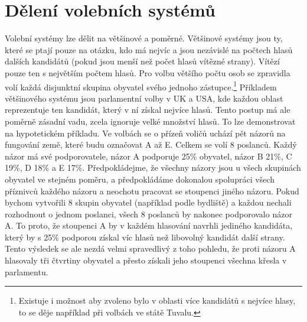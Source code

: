 \documentclass[12pt]{report}
\begin{document}
\section{Dělení volebních systémů}
Volební systémy lze dělit na většinové a poměrné.
Většinové systémy jsou ty, které se ptají pouze na otázku, kdo má nejvíc a jsou nezávislé na počtech hlasů dalších kandidátů (pokud jsou menší než počet hlasů vítězné strany).
Vítězí pouze ten s největším počtem hlasů.
Pro volbu většího počtu osob se zpravidla volí každá disjunktní skupina obyvatel svého jednoho zástupce.\footnote{Existuje i možnost aby zvoleno bylo v oblasti více kandidátů s nejvíce hlasy, to se děje například při volbách ve státě Tuvalu.\autocite{TUV}}
Příkladem většinového systému jsou parlamentní volby v UK a USA, kde každou oblast reprezentuje ten kandidát, který v ní získal nejvíce hlasů.
Tento postup má ale poměrně zásadní vadu, zcela ignoruje velké množství hlasů.
To lze demonstrovat na hypotetickém příkladu.
Ve volbách se o přízeň voličů uchází pět názorů na fungování země, které budu označovat A až E.
Celkem se volí 8 poslanců.
Každý názor má své podporovatele, názor A podporuje 25\% obyvatel, názor B 21\%, C 19\%, D 18\% a E 17\%.
Předpokládejme, že všechny názory jsou u všech skupinách obyvatel ve stejném poměru, a předpokládáme dokonalou spolupráci všech příznivců každého názoru a neochotu pracovat se stoupenci jiného názoru.
Pokud bychom vytvořili 8 skupin obyvatel (například podle bydliště) a každou nechali rozhodnout o jednom poslanci, všech 8 poslanců by nakonec podporovalo názor A.
To proto, že stoupenci A by v každém hlasování navrhli jediného kandidáta, který by s 25\% podporou získal víc hlasů než libovolný kandidát další strany.
Tento výsledek se ale nezdá velmi spravedlivý z toho pohledu, že proti názoru A hlasovaly tři čtvrtiny obyvatel a přesto získali jeho stoupenci všechna křesla v parlamentu.
\end{document}
